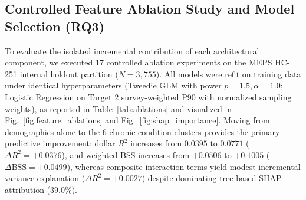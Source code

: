 \documentclass[runningheads]{llncs}
\begin{document}
\subsection{Controlled Feature Ablation Study and Model Selection (RQ3)}
To evaluate the isolated incremental contribution of each architectural component, we executed 17 controlled ablation experiments on the MEPS HC-251 internal holdout partition ($N=3,755$). All models were refit on training data under identical hyperparameters (Tweedie GLM with power $p=1.5, \alpha=1.0$; Logistic Regression on Target 2 survey-weighted P90 with normalized sampling weights), as reported in Table~\ref{tab:ablations} and visualized in Fig.~\ref{fig:feature_ablations} and Fig.~\ref{fig:shap_importance}. Moving from demographics alone to the 6 chronic-condition clusters provides the primary predictive improvement: dollar $R^2$ increases from $0.0395$ to $0.0771$ ($\Delta R^2 = +0.0376$), and weighted BSS increases from $+0.0506$ to $+0.1005$ ($\Delta \text{BSS} = +0.0499$), whereas composite interaction terms yield modest incremental variance explanation ($\Delta R^2 = +0.0027$) despite dominating tree-based SHAP attribution ($39.0\%$).
\end{document}
